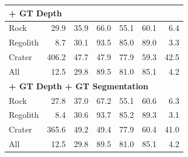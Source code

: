 \begin{table}[h]
\begin{tabular}[t]{|lrrrrrr|}
		\hline
		\multicolumn{7}{|l|}{\textbf{+ GT Depth}}                                                 \\ \hline
		Rock                                           & 29.9  & 35.9 & 66.0 & 55.1 & 60.1 & 6.4  \\
		Regolith                                       & 8.7   & 30.1 & 93.5 & 85.0 & 89.0 & 3.3  \\
		Crater                                         & 406.2 & 47.7 & 47.9 & 77.9 & 59.3 & 42.5 \\
		All                                            & 12.5  & 29.8 & 89.5 & 81.0 & 85.1 & 4.2  \\
		\hline
		\multicolumn{7}{|l|}{\textbf{+ GT Depth + GT Segmentation}}                               \\ \hline
		Rock                                           & 27.8  & 37.0 & 67.2 & 55.1 & 60.6 & 6.3  \\
		Regolith                                       & 8.4   & 30.6 & 93.7 & 85.2 & 89.3 & 3.1  \\
		Crater                                         & 365.6 & 49.2 & 49.4 & 77.9 & 60.4 & 41.0 \\
		All                                            & 12.5  & 29.8 & 89.5 & 81.0 & 85.1 & 4.2  \\
		\hline
	\end{tabular}
\end{table}
